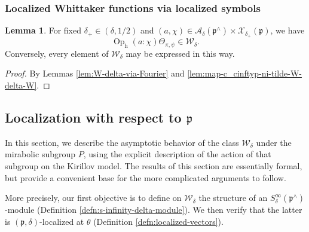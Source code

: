 \documentclass[reqno]{amsart}
\DeclareMathOperator{\h}{h}
\DeclareMathOperator{\Opp}{Op}
\theoremstyle{plain} \newtheorem{theorem} {Theorem}
\theoremstyle{definition} \newtheorem{definition} [theorem] {Definition}
\theoremstyle{itplain} %
\newtheorem{lemma}[theorem]{Lemma}
\numberwithin{equation}{section}
\numberwithin{theorem}{section}
\begin{document}
\subsubsection{Localized Whittaker functions via localized symbols}

\begin{lemma}\label{lem:every-elem-mathc}
For fixed $\delta_+ \in (\delta,1/2)$ and $(a,\chi) \in \mathcal{A}_\delta(\mathfrak{p}^\wedge) \times \mathcal{X}_{\delta_+}(\mathfrak{p})$, we have
\begin{equation*}
  \Opp_{\h}(a:\chi) \Theta_{\pi,\psi} \in \mathcal{W}_\delta.
\end{equation*}
Conversely, every element of $\mathcal{W}_\delta$ may be expressed in this way.
\end{lemma}
\begin{proof}
  By Lemmas \ref{lem:W-delta-via-Fourier} and \ref{lem:map-c_cinftyp-ni-tilde-W-delta-W}.
\end{proof}



\subsection{Localization with respect to $\mathfrak{p}$}\label{sec:local-with-resp-P}
In this section, we describe the asymptotic behavior of the class $\mathcal{W}_\delta$ under the mirabolic subgroup $P$, using the explicit description of the action of that subgroup on the Kirillov model.  The results of this section are essentially formal, but provide a convenient base for the more complicated arguments to follow.

More precisely, our first objective is to define on $\mathcal{W}_\delta$ the structure of an $S^\infty_\delta(\mathfrak{p}^\wedge)$-module (Definition \ref{defn:s-infinity-delta-module}).  We then verify that the latter is $(\mathfrak{p},\delta)$-localized at $\theta$ (Definition \ref{defn:localized-vectors}).
\end{document}

